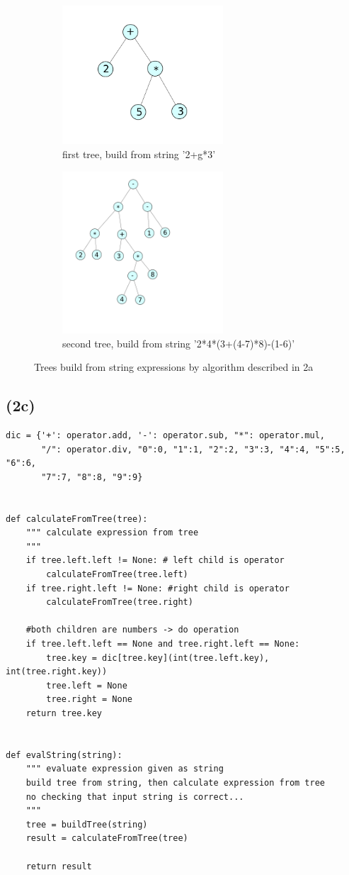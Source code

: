 \documentclass[a4paper]{article}
\begin{document}
\begin{figure}
  \begin{subfigure}[b]{0.5\textwidth}
    \centering
    \includegraphics[width=6cm]{tree1.png}
    \caption{first tree, build from string '2+g*3'}
  \end{subfigure}
  \begin{subfigure}[b]{0.5\textwidth}
    \includegraphics[width=6cm]{tree2.png}
    \caption{second tree, build from string '2*4*(3+(4-7)*8)-(1-6)'}
  \end{subfigure}
  \caption{Trees build from string expressions by algorithm described in 2a}
  \label{fig:trees}
\end{figure}


\subsection*{(2c)}


\begin{verbatim}
dic = {'+': operator.add, '-': operator.sub, "*": operator.mul, 
       "/": operator.div, "0":0, "1":1, "2":2, "3":3, "4":4, "5":5, "6":6,
       "7":7, "8":8, "9":9}


def calculateFromTree(tree):
    """ calculate expression from tree
    """
    if tree.left.left != None: # left child is operator
        calculateFromTree(tree.left)
    if tree.right.left != None: #right child is operator
        calculateFromTree(tree.right)

    #both children are numbers -> do operation
    if tree.left.left == None and tree.right.left == None:                    
        tree.key = dic[tree.key](int(tree.left.key), int(tree.right.key))
        tree.left = None
        tree.right = None
    return tree.key


def evalString(string):
    """ evaluate expression given as string
    build tree from string, then calculate expression from tree
    no checking that input string is correct...
    """
    tree = buildTree(string)
    result = calculateFromTree(tree)

    return result
\end{verbatim}


\end{document}
